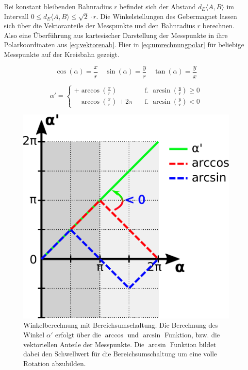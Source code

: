 \clearpage


Bei konstant bleibenden Bahnradius $r$ befindet sich der Abstand $d_E\langle A,B \rangle$ im Intervall $0 \le 
d_E\langle A,B \rangle \le \sqrt{2}\cdot r$. Die Winkelstellungen des Gebermagnet lassen sich über die Vektoranteile 
der Messpunkte und den Bahnradius $r$ berechnen. Also eine Überführung aus kartesischer Darstellung der Messpunkte in 
ihre Polarkoordinaten aus \autoref{eq:vektorenab}. Hier in \autoref{eq:umrechnungpolar} für beliebige Messpunkte auf 
der Kreisbahn gezeigt.

\begin{equation}\label{eq:umrechnungpolar}
	\cos(\alpha) = \frac{x}{r} \quad\sin(\alpha) = \frac{y}{r} \quad\tan(\alpha) = \frac{y}{x}
\end{equation}

\begin{equation}
	\alpha' = 
	\begin{cases}
		+\arccos\left(\frac{x}{r}\right)        & \quad\text{f. } \arcsin\left(\frac{y}{r}\right) \ge 0\\
		-\arccos\left(\frac{x}{r}\right) + 2\pi & \quad\text{f. } \arcsin\left(\frac{y}{r}\right) < 0
	\end{cases}
\end{equation}


\begin{figure}[tbph]
	\centering
	\includegraphics[width=0.5\linewidth]{chapters/images/Winkelumrechnung_Polar}
	\caption[Winkelrückrechnung mit Bereichsumschaltung]{Winkelberechnung mit Bereichsumschaltung. Die Berechnung des 
	Winkel $\alpha'$ erfolgt über die $\arccos$ und $\arcsin$ Funktion, bzw. die vektoriellen Anteile der Messpunkte. 
	Die $\arcsin$ Funktion bildet dabei den Schwellwert für die Bereichsumschaltung um eine volle Rotation abzubilden.}
	\label{fig:winkelumrechnungpolar}
\end{figure}



